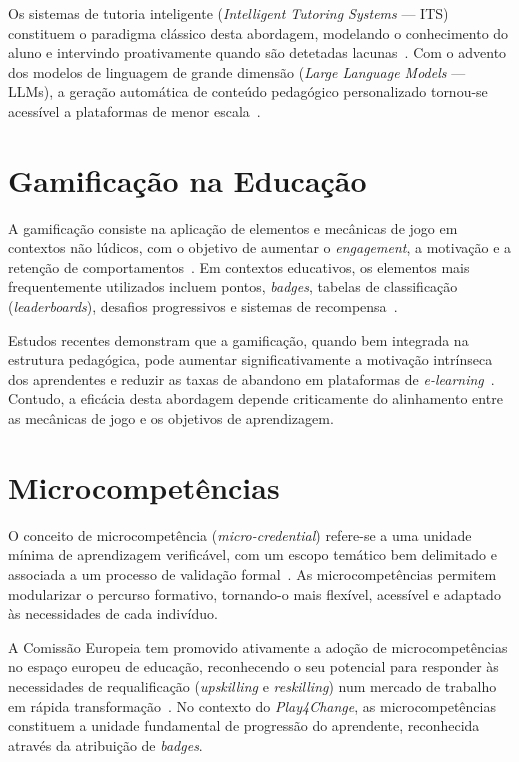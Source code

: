 Os sistemas de tutoria inteligente (\textit{Intelligent Tutoring Systems} --- ITS) constituem o paradigma clássico desta abordagem, modelando o conhecimento do aluno e intervindo proativamente quando são detetadas lacunas~\cite{bloom1984sigma}. Com o advento dos modelos de linguagem de grande dimensão (\textit{Large Language Models} --- LLMs), a geração automática de conteúdo pedagógico personalizado tornou-se acessível a plataformas de menor escala~\cite{kasneci2023chatgpt}.

\section{Gamificação na Educação}
\label{sec:gamification}

A gamificação consiste na aplicação de elementos e mecânicas de jogo em contextos não lúdicos, com o objetivo de aumentar o \textit{engagement}, a motivação e a retenção de comportamentos~\cite{deterding2011game}. Em contextos educativos, os elementos mais frequentemente utilizados incluem pontos, \textit{badges}, tabelas de classificação (\textit{leaderboards}), desafios progressivos e sistemas de recompensa~\cite{hamari2014does}.

Estudos recentes demonstram que a gamificação, quando bem integrada na estrutura pedagógica, pode aumentar significativamente a motivação intrínseca dos aprendentes e reduzir as taxas de abandono em plataformas de \textit{e-learning}~\cite{hamari2014does}. Contudo, a eficácia desta abordagem depende criticamente do alinhamento entre as mecânicas de jogo e os objetivos de aprendizagem.

\section{Microcompetências}
\label{sec:microcompetencias}

O conceito de microcompetência (\textit{micro-credential}) refere-se a uma unidade mínima de aprendizagem verificável, com um escopo temático bem delimitado e associada a um processo de validação formal~\cite{eur2022micro}. As microcompetências permitem modularizar o percurso formativo, tornando-o mais flexível, acessível e adaptado às necessidades de cada indivíduo.

A Comissão Europeia tem promovido ativamente a adoção de microcompetências no espaço europeu de educação, reconhecendo o seu potencial para responder às necessidades de requalificação (\textit{upskilling} e \textit{reskilling}) num mercado de trabalho em rápida transformação~\cite{eur2022micro}. No contexto do \textit{Play4Change}, as microcompetências constituem a unidade fundamental de progressão do aprendente, reconhecida através da atribuição de \textit{badges}.


